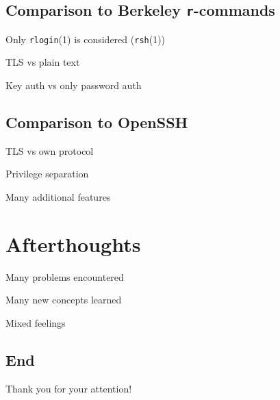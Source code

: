 \documentclass[
	xcolor=dvipsnames,
	handout
]{beamer}
\newenvironment{zhawframe}[1][]
{\begin{frame}[environment=fr,#1]{\insertsubsectionhead}{\insertsectionhead}}
{\end{frame}
}
\begin{document}
\subsection{Comparison to Berkeley \texttt{r}-commands}
\begin{zhawframe}
 Only \texttt{rlogin}(1) is considered (\texttt{rsh}(1))

 TLS vs plain text

 Key auth vs only password auth
\end{zhawframe}

\subsection{Comparison to OpenSSH}
\begin{zhawframe}
 TLS vs own protocol

 Privilege separation

 Many additional features
\end{zhawframe}

\section{Afterthoughts}
\begin{zhawframe}
 Many problems encountered

 Many new concepts learned

 Mixed feelings
\end{zhawframe}

\subsection{End}
\begin{zhawframe}
Thank you for your attention!
\end{zhawframe}
\end{document}
